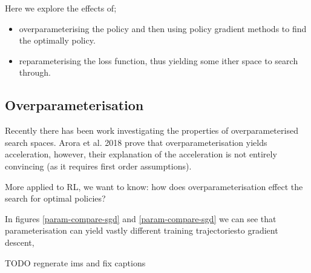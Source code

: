 Here we explore the effects of;
\begin{itemize}
\tightlist
  \item overparameterising the policy and then using policy gradient methods to find the optimally policy.
  \item reparameterising the loss function, thus yielding some ither space to search through.
\end{itemize}




\subsection{Overparameterisation}

Recently there has been work investigating the properties of overparameterised search spaces.
Arora et al. 2018 \cite{Arora2018} prove that overparameterisation yields acceleration, however,
their explanation of the acceleration is not entirely convincing (as it requires first order assumptions).

More applied to RL, we want to know: how does overparameterisation effect the search for optimal policies?

In figures \ref{param-compare-sgd} and \ref{param-compare-sgd} we can see that
parameterisation can yield vastly different training trajectories\footnotemark to gradient descent,


{\color{red}TODO regnerate ims and fix captions}

